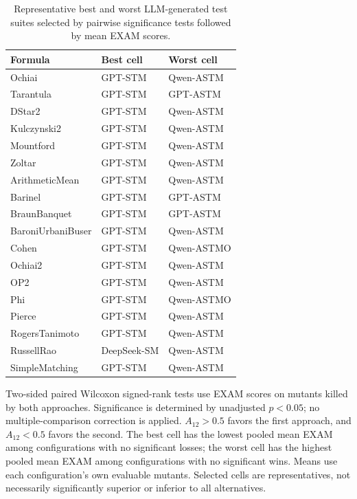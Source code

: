 \begin{table}[t]
\centering
\caption{Representative best and worst LLM-generated test suites selected by pairwise significance tests followed by mean EXAM scores.}
\label{tab:rq3bw-selection}
\begin{tabular}{lll}
\hline
Formula & Best cell & Worst cell \\
\hline
Ochiai & GPT-STM & Qwen-ASTM \\
Tarantula & GPT-STM & GPT-ASTM \\
DStar2 & GPT-STM & Qwen-ASTM \\
Kulczynski2 & GPT-STM & Qwen-ASTM \\
Mountford & GPT-STM & Qwen-ASTM \\
Zoltar & GPT-STM & Qwen-ASTM \\
ArithmeticMean & GPT-STM & Qwen-ASTM \\
Barinel & GPT-STM & GPT-ASTM \\
BraunBanquet & GPT-STM & GPT-ASTM \\
BaroniUrbaniBuser & GPT-STM & Qwen-ASTM \\
Cohen & GPT-STM & Qwen-ASTMO \\
Ochiai2 & GPT-STM & Qwen-ASTM \\
OP2 & GPT-STM & Qwen-ASTM \\
Phi & GPT-STM & Qwen-ASTMO \\
Pierce & GPT-STM & Qwen-ASTM \\
RogersTanimoto & GPT-STM & Qwen-ASTM \\
RussellRao & DeepSeek-SM & Qwen-ASTM \\
SimpleMatching & GPT-STM & Qwen-ASTM \\
\hline
\end{tabular}
\par\smallskip
\begin{minipage}{\linewidth}\footnotesize Two-sided paired Wilcoxon signed-rank tests use EXAM scores on mutants killed by both approaches. Significance is determined by unadjusted $p<0.05$; no multiple-comparison correction is applied. $A_{12}>0.5$ favors the first approach, and $A_{12}<0.5$ favors the second. The best cell has the lowest pooled mean EXAM among configurations with no significant losses; the worst cell has the highest pooled mean EXAM among configurations with no significant wins. Means use each configuration's own evaluable mutants. Selected cells are representatives, not necessarily significantly superior or inferior to all alternatives.
\end{minipage}
\end{table}
